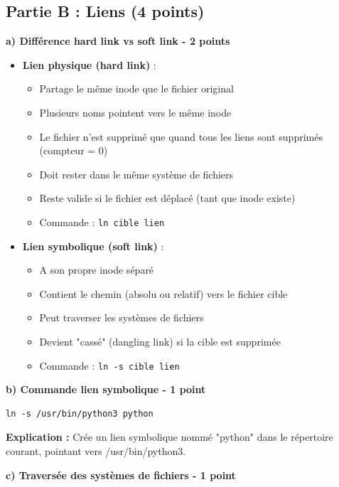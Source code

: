 \documentclass[12pt,a4paper]{article}
\begin{document}
\subsection*{Partie B : Liens (4 points)}

\begin{answerbox}
\textbf{a) Différence hard link vs soft link - 2 points}

\begin{itemize}
    \item \textbf{Lien physique (hard link)} :
    \begin{itemize}
        \item Partage le même inode que le fichier original
        \item Plusieurs noms pointent vers le même inode
        \item Le fichier n'est supprimé que quand tous les liens sont supprimés (compteur = 0)
        \item Doit rester dans le même système de fichiers
        \item Reste valide si le fichier est déplacé (tant que inode existe)
        \item Commande : \texttt{ln cible lien}
    \end{itemize}
    \item \textbf{Lien symbolique (soft link)} :
    \begin{itemize}
        \item A son propre inode séparé
        \item Contient le chemin (absolu ou relatif) vers le fichier cible
        \item Peut traverser les systèmes de fichiers
        \item Devient "cassé" (dangling link) si la cible est supprimée
        \item Commande : \texttt{ln -s cible lien}
    \end{itemize}
\end{itemize}

\textbf{b) Commande lien symbolique - 1 point}

\begin{lstlisting}
ln -s /usr/bin/python3 python
\end{lstlisting}

\textbf{Explication :} Crée un lien symbolique nommé "python" dans le répertoire courant, pointant vers /usr/bin/python3.

\textbf{c) Traversée des systèmes de fichiers - 1 point}


\end{answerbox}
\end{document}
